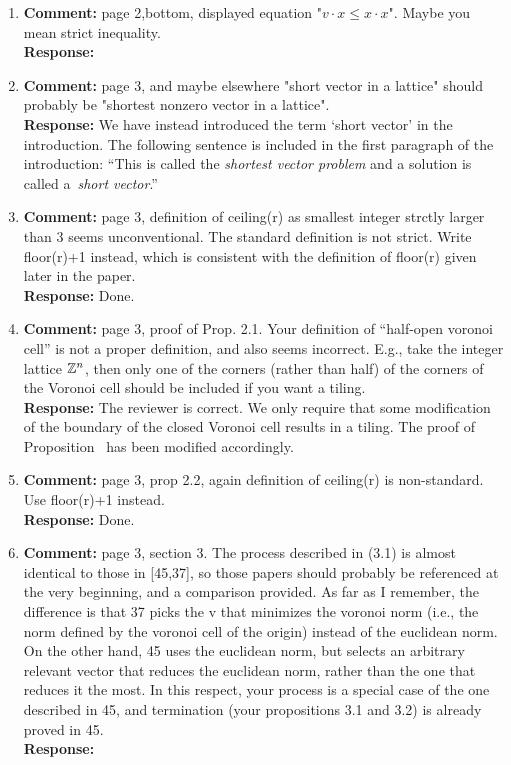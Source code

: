 \documentclass[a4paper,10pt]{article}
\begin{document}
\begin{enumerate}
\item\textbf{Comment:}  
page 2,bottom, displayed equation "$v \cdot x \leq x \cdot x$". Maybe you mean strict inequality.
\\\textbf{Response:}

\item\textbf{Comment:}  
page 3, and maybe elsewhere "short vector in a lattice" should probably be "shortest nonzero vector in a lattice". 
\\\textbf{Response:}
We have instead introduced the term `short vector' in the introduction.  The following sentence is included in the first paragraph of the introduction: ``This is called the \emph{shortest vector problem} and a solution is called a~\emph{short vector}.''

\item\textbf{Comment:}  
page 3, definition of ceiling(r) as smallest integer strctly larger than 3 seems unconventional. The standard definition is not strict. Write floor(r)+1 instead, which is consistent with the definition of floor(r) given later in the paper. 
\\\textbf{Response:}
Done.

\item\textbf{Comment:}  
page 3, proof of Prop. 2.1. Your definition of ``half-open voronoi cell'' is not a proper definition, and also seems incorrect. E.g., take the integer lattice ${\mathbb Z}^n$, then only one of the corners (rather than half) of the corners of the Voronoi cell should be included if you want a tiling. 
\\\textbf{Response:}
The reviewer is correct.  We only require that some modification of the boundary of the closed Voronoi cell results in a tiling.  The proof of Proposition~ has been modified accordingly.

\item\textbf{Comment:}  
page 3, prop 2.2, again definition of ceiling(r) is non-standard. Use floor(r)+1 instead. 
\\\textbf{Response:}
Done. 

\item\textbf{Comment:}  
page 3, section 3. 
The process described in (3.1) is almost identical to those in [45,37], so those papers should probably be referenced at the very beginning, and a comparison provided. As far as I remember, the difference is that 37 picks the v that minimizes the voronoi norm (i.e., the norm defined by the voronoi cell of the origin) instead of the euclidean norm. On the other hand, 45 uses the euclidean norm, but selects an arbitrary relevant vector that reduces the euclidean norm, rather than the one that reduces it the most. In this respect, your process is a special case of the one described in 45, and termination (your propositions 3.1 and 3.2) is already proved in 45. 
\\\textbf{Response:}


\end{enumerate}
\end{document}
